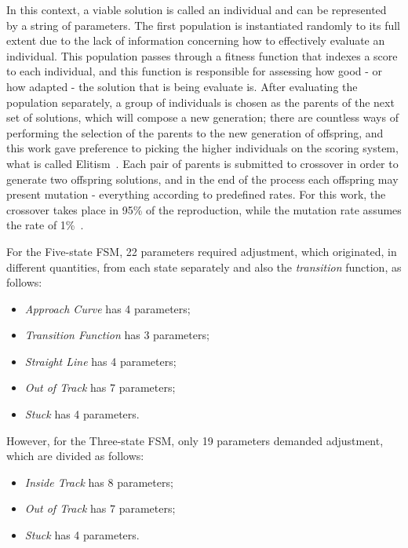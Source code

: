 	In this context, a viable solution is called an individual and can be represented by a string of parameters. The
	first population is instantiated randomly to its full extent due to the lack of information concerning how to
	effectively evaluate an individual. This population passes through a fitness function that indexes a score to
	each individual, and this function is responsible for assessing how good - or how adapted - the solution that is
	being evaluate is. After evaluating the population separately, a group of individuals is chosen as the parents of
	the next set of solutions, which will compose a new generation; there are countless ways of performing the
	selection of the parents to the new generation of offspring, and this work gave preference to picking the higher
	individuals on the scoring system, what is called Elitism~\cite{ELITISM}. Each pair of parents is submitted to
	crossover in order to generate two offspring solutions, and in the end of the process each offspring may present
	mutation - everything according to predefined rates. For this work, the crossover takes place in 95\% of the
	reproduction, while the mutation rate assumes the rate of 1\%~\cite{RATES}.
	
	For the Five-state FSM, 22 parameters required adjustment, which originated, in different quantities, from each
	state separately and also the \emph{transition} function, as follows:
	
	\begin{itemize}
		
		\item \emph{Approach Curve} has 4 parameters;
		
		\item \emph{Transition Function} has 3 parameters;
		
		\item \emph{Straight Line} has 4 parameters;
		
		\item \emph{Out of Track} has 7 parameters;
		
		\item \emph{Stuck} has 4 parameters.
		
	\end{itemize}
	
	However, for the Three-state FSM, only 19 parameters demanded adjustment, which are divided as follows:
	
	\begin{itemize}
		
		\item \emph{Inside Track} has 8 parameters;
		
		\item \emph{Out of Track} has 7 parameters;
		
		\item \emph{Stuck} has 4 parameters.
		
	\end{itemize}
	
